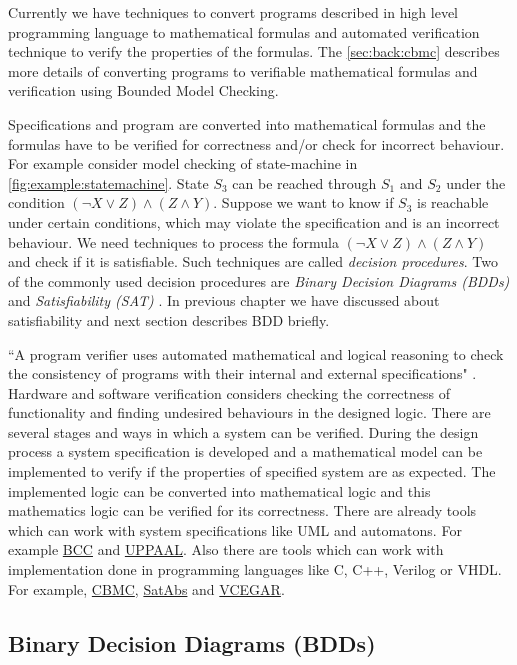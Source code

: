 Currently we have techniques to convert programs described in high level programming language to mathematical formulas and automated verification technique to verify the properties of the formulas. The \autoref{sec:back:cbmc} describes more details of converting programs to verifiable mathematical formulas and verification using Bounded Model Checking.

Specifications and program are converted into mathematical formulas and the formulas have to be verified for correctness and/or check for incorrect behaviour. For example consider model checking of state-machine in \autoref{fig:example:statemachine}. State $S_3$ can be reached through $S_1$ and $S_2$ under the condition $(\neg X \vee Z) \wedge (Z \wedge Y)$. Suppose we want to know if $S_3$ is reachable under certain conditions, which may violate the specification and is an incorrect behaviour. We need techniques to process the formula $(\neg X \vee Z) \wedge (Z \wedge Y)$ and check if it is satisfiable. Such techniques are called \emph{decision procedures}. Two of the commonly used decision procedures are \emph{Binary Decision Diagrams (BDDs)} and \emph{Satisfiability (SAT)} \cite{kroening2008decision}. In previous chapter we have discussed about satisfiability and next section describes BDD briefly.

``A program verifier uses automated mathematical and logical reasoning to check the consistency of programs with their internal and external specifications" \cite{Hoare03theverifying}. Hardware and software verification considers checking the correctness of functionality and finding undesired behaviours in the designed logic. There are several stages and ways in which a system can be verified. During the design process a system specification is developed and a mathematical model can be implemented to verify if the properties of specified system are as expected. The implemented logic can be converted into mathematical logic and this mathematics logic can be verified for its correctness. There are already tools which can work with system specifications like UML and automatons. For example \href{http://move.lip6.fr/software/BCC/index.html}{BCC} and \href{http://www.uppaal.com/}{UPPAAL}. Also there are tools which can work with implementation done in programming languages like C, C++, Verilog or VHDL. For example, \href{http://www.cprover.org/cbmc/}{CBMC}, \href{http://www.cprover.org/satabs/}{SatAbs} and \href{http://www.cs.cmu.edu/~modelcheck/vcegar/}{VCEGAR}. 
\subsection{Binary Decision Diagrams (BDDs)}

